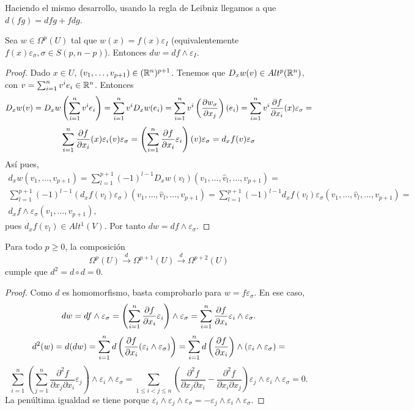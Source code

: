 \documentclass[CV.tex]{subfiles}
\begin{document}
\begin{nota}
Haciendo el mismo desarrollo, usando la regla de Leibniz llegamos a que $d(fg)=dfg+fdg$.
\end{nota}

\begin{lemma}
Sea $w\in\Omega^p(U)$ tal que $w(x)=f(x)\varepsilon_I$ (equivalentemente $f(x)\varepsilon_{\sigma}, \sigma\in S(p,n-p)$). Entonces $dw=df\land\varepsilon_I$. 
\end{lemma}
\begin{proof}
Dado $x\in U$, $(v_1,\dots, v_{p+1})\in(\mathbb{R}^n)^{p+1}$. Tenemos que $D_xw(v)\in Alt^p(\mathbb{R}^n)$, con $v=\sum_{i=1}^nv^ie_i\in\mathbb{R}^n$. Entonces
\[
D_xw(v)=D_xw\left(\sum_{i=1}^nv^ie_i\right)=\sum_{i=1}^nv^iD_xw(e_i)=\sum_{i=1}^nv^i\left(\frac{\partial w_{\sigma}}{\partial x_j}\right)(e_i)=\sum_{i=1}^nv^i\frac{\partial f}{\partial x_i}(x)\varepsilon_{\sigma}=
\]
\[
\sum_{i=1}^n\frac{\partial f}{\partial x_i}(x)\varepsilon_i(v)\varepsilon_{\sigma}=\left(\sum_{i=1}^n\frac{\partial f}{\partial x_i}\varepsilon_i\right)(v)\varepsilon_{\sigma}=d_xf(v)\varepsilon_{\sigma}
\]
Así pues, 
\begin{gather*}
d_xw(v_1,\dots, v_{p+1})=\sum_{l=1}^{p+1}(-1)^{l-1}D_xw(v_l)(v_1,\dots, \hat{v}_l,\dots, v_{p+1})=\\
\sum_{l=1}^{p+1}(-1)^{l-1}(d_xf(v_l)\varepsilon_{\sigma})(v_1,\dots, \hat{v}_l,\dots, v_{p+1})=\sum_{l=1}^{p+1}(-1)^{l-1}d_xf(v_l)\varepsilon_{\sigma}(v_1,\dots, \hat{v}_l,\dots, v_{p+1})=\\
d_xf\land\varepsilon_{\sigma}(v_1,\dots, v_{p+1}),
\end{gather*}
pues $d_xf(v_l)\in Alt^1(V)$. Por tanto $dw=df\land\varepsilon_{\sigma}$.
\end{proof}

\begin{lemma}
Para todo $p\geq 0$, la composición
\[
\Omega^p(U)\overset{d}{\longrightarrow}\Omega^{p+1}(U)\overset{d}{\longrightarrow}\Omega^{p+2}(U)
\]
cumple que $d^2=d\circ d=0$.
\end{lemma}
\begin{proof}
Como $d$ es homomorfismo, basta comprobarlo para $w=f\varepsilon_{\sigma}$. En ese caso, 
\[dw=df\land\varepsilon_{\sigma}=\left(\sum_{i=1}^n\frac{\partial f}{\partial x_i}\varepsilon_i\right)\land\varepsilon_{\sigma}=\sum_{i=1}^n\frac{\partial f}{\partial x_i}\varepsilon_i\land\varepsilon_{\sigma}.
\]
\[d^2(w)=d(dw)=\sum_{i=1}^nd\left(\frac{\partial f}{\partial x_i}(\varepsilon_i\land\varepsilon_{\sigma})\right)=\sum_{i=1}^nd\left(\frac{\partial f}{\partial x_i}\right)\land(\varepsilon_i\land\varepsilon_{\sigma})=
\]
\[
\sum_{i=1}^n\left(\sum_{j=1}^n\frac{\partial^2 f}{\partial x_j\partial x_i}\varepsilon_j\right)\land\varepsilon_i\land\varepsilon_{\sigma}=\sum_{1\leq i< j\leq n}\left(\frac{\partial^2 f}{\partial x_j\partial x_i}-\frac{\partial^2 f}{\partial x_i\partial x_j}\right)\varepsilon_j\land\varepsilon_i\land\varepsilon_{\sigma}=0.
\]
La penúltima igualdad se tiene porque $\varepsilon_i\land\varepsilon_j\land\varepsilon_{\sigma}=-\varepsilon_j\land\varepsilon_i\land\varepsilon_{\sigma}$.
\end{proof}
\end{document}
